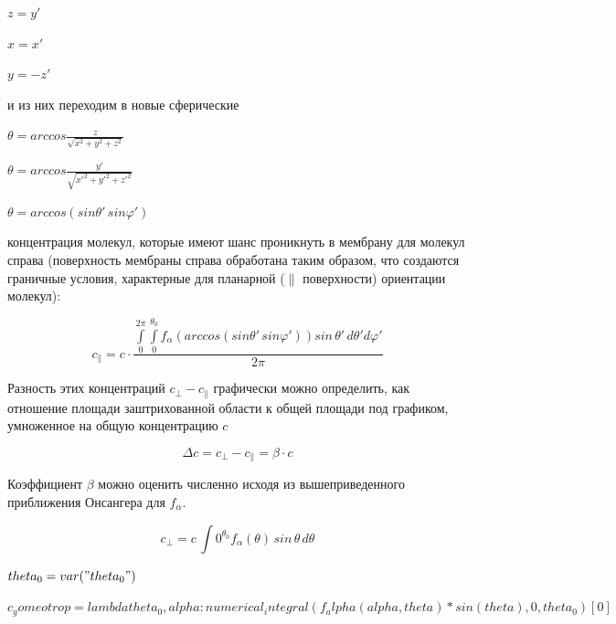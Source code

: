 \documentclass[11pt]{article}
\begin{document}
\(z = y'\)

\(x = x'\)

\(y = -z'\)

и из них переходим в новые сферические

\(\theta = arccos\frac{z}{\sqrt{x^2+y^2+z^2}}\)

\(\theta = arccos\frac{y'}{\sqrt{x'^2+y'^2+z'^2}}\)

\(\theta = arccos\left(sin \theta'\,sin \varphi'\right)\)

концентрация молекул, которые имеют шанс проникнуть в мембрану для
молекул справа (поверхность мембраны справа обработана таким образом,
что создаются граничные условия, характерные для планарной
(\(\parallel\) поверхности) ориентации молекул):

\[c_{\parallel}=c\cdot\frac{\int \limits_{0}^{2 \pi}\int\limits_{0}^{\theta_{0}}f_{\alpha}\left(arccos\left(sin \theta'\,sin \varphi'\right)\right)sin\,\theta'\,d\theta'd\varphi'}{2\pi}\]

    Разность этих концентраций \(c_{\bot}-c_{\parallel}\) графически можно
определить, как отношение площади заштрихованной области к общей площади
под графиком, умноженное на общую концентрацию \(c\)

\[\Delta c = c_{\bot}-c_{\parallel} = \beta \cdot c\]

Коэффициент \(\beta\) можно оценить численно исходя из вышеприведенного
приближения Онсангера для \(f_{\alpha}\).

    \[c_{\bot}=c\,\int \limits{0}^{\theta_{0}}f_{\alpha}\left(\theta\right)\,sin\,\theta\,d\theta\]

$theta_0 = var("theta_0")$

$c_gomeotrop = lambda theta_0, alpha : numerical_integral(f_alpha(alpha, theta)*sin(theta), 0, theta_0)[0]$

\end{document}
